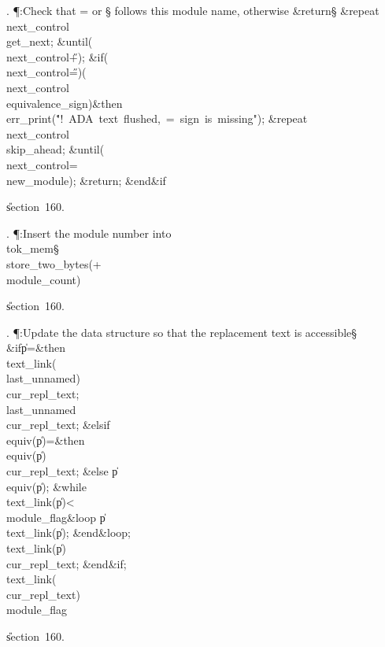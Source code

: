 . \P\?:Check that \?=\? or \?\S\? follows this module name, otherwise
\&{return}\X\S\?\6
\1\&{repeat}\6
\\{next\_control}\?\K\?\\{get\_next};\2\6
\&{until}\?\8\1(\?\\{next\_control}\?\I\?\H{+}\?\2)\?;\6
\&{if}\1\1\?\8\1(\?\\{next\_control}\?\I\?\H{=}\?\2)\W\1(\?\\{next\_control}\?%
\I\?\\{equivalence\_sign}\?\2)\?\2\8\&{then}\6
\\{err\_print}\?\1(\?\.{"!\ ADA\ text\ flushed,\ =\ sign\ is\ missing"}\?\2)\?;%
\6
\1\&{repeat}\6
\\{next\_control}\?\K\?\\{skip\_ahead};\2\6
\&{until}\?\8\1(\?\\{next\_control}\?=\?\\{new\_module}\?\2)\?;\6
\&{return};\2\6
\&{end}\8\2\&{if}\1\par
\U section~160.\fi

. \P\?:Insert the module number into \\{tok\_mem}\X\S\?\6
\\{store\_two\_bytes}\?\1(+\?\\{module\_count}\?\2)\?\par
\U section~160.\fi

. \P\?:Update the data structure so that the replacement text is
accessible\X\S\?\6
\&{if}\1\1\8\|p\?=\2\8\&{then}\6
\\{text\_link}\?\1(\?\\{last\_unnamed}\?\2)\K\?\\{cur\_repl\_text};\5
\\{last\_unnamed}\?\K\?\\{cur\_repl\_text};\6
\4\&{elsif}\1\8\\{equiv}\?\1(\?\|p\?\2)=\2\8\&{then}\6
\\{equiv}\?\1(\?\|p\?\2)\K\?\\{cur\_repl\_text};\6
\4\&{else}\6
\|p\?\K\?\\{equiv}\?\1(\?\|p\?\2)\?;\6
\1\&{while}\8\\{text\_link}\?\1(\?\|p\?\2)<\?\\{module\_flag}\8\&{loop}\6
\|p\?\K\?\\{text\_link}\?\1(\?\|p\?\2)\?;\2\6
\&{end}\8\&{loop};\6
\\{text\_link}\?\1(\?\|p\?\2)\K\?\\{cur\_repl\_text};\2\6
\&{end}\8\2\&{if}\1;\6
\\{text\_link}\?\1(\?\\{cur\_repl\_text}\?\2)\K\?\\{module\_flag}\par
\U section~160.\fi

